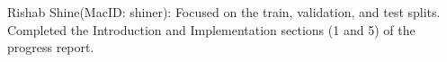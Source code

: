 \documentclass[11pt]{article}
\begin{document}
Rishab Shine(MacID: shiner): Focused on the train, validation, and test splits. Completed the Introduction and Implementation sections (1 and 5) of the progress report.

%





\end{document}
